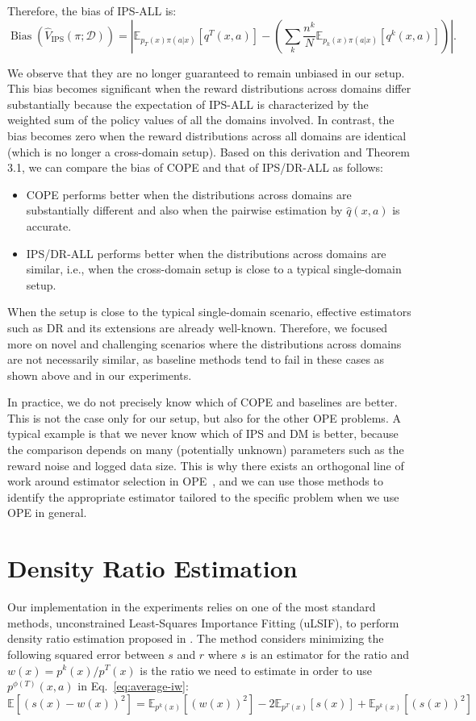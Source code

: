 Therefore, the bias of IPS-ALL is:
$$ 
\operatorname{Bias}(\hat{V}_{\mathrm{IPS}}(\pi ; \mathcal{D})) = 
\left| \mathbb{E}_{p_T(x)\pi(a|x)}[q^T(x,a)] - \left( \sum_k \frac{n^k}{N} \mathbb{E}_{p_k(x)\pi(a|x)}[q^k(x,a)] \right)  \right|.
$$

We observe that they are no longer guaranteed to remain unbiased in our setup. This bias becomes significant when the reward distributions across domains differ substantially because the expectation of IPS-ALL is characterized by the weighted sum of the policy values of all the domains involved. In contrast, the bias becomes zero when the reward distributions across all domains are identical (which is no longer a cross-domain setup).
Based on this derivation and Theorem 3.1, we can compare the bias of COPE and that of IPS/DR-ALL as follows:
\begin{itemize}
    \item COPE performs better when the distributions across domains are substantially different and also when the pairwise estimation by $\hat{q}(x,a)$ is accurate.
    \item IPS/DR-ALL performs better when the distributions across domains are similar, i.e., when the cross-domain setup is close to a typical single-domain setup.
\end{itemize}

When the setup is close to the typical single-domain scenario, effective estimators such as DR and its extensions are already well-known. Therefore, we focused more on novel and challenging scenarios where the distributions across domains are not necessarily similar, as baseline methods tend to fail in these cases as shown above and in our experiments.

In practice, we do not precisely know which of COPE and baselines are better. This is not the case only for our setup, but also for the other OPE problems. A typical example is that we never know which of IPS and DM is better, because the comparison depends on many (potentially unknown) parameters such as the reward noise and logged data size. This is why there exists an orthogonal line of work around estimator selection in OPE~\citep{su2020adaptive,udagawa2023policy,cief2024cross}, and we can use those methods to identify the appropriate estimator tailored to the specific problem when we use OPE in general.

\section{Density Ratio Estimation} \label{app:dre}
Our implementation in the experiments relies on one of the most standard methods, unconstrained Least-Squares Importance Fitting (uLSIF), to perform density ratio estimation proposed in \citep{kanamori2012statistical,sugiyama2012density}. The method considers minimizing the following squared error between $s$ and $r$ where $s$ is an estimator for the ratio and $w(x) = p^k(x)/p^{T}(x)$ is the ratio we need to estimate in order to use $p^{\phi(T)}(x, a)$ in Eq.~\eqref{eq:average-iw}:
$$
\mathbb{E} [(s(x)-w(x))^{2}]=\mathbb{E}_{p^k(x)} [(w(x))^{2}]-2 \mathbb{E}_{p^{T}(x)} [s(x)]+\mathbb{E}_{p^k(x)} [(s(x))^{2}]
$$

